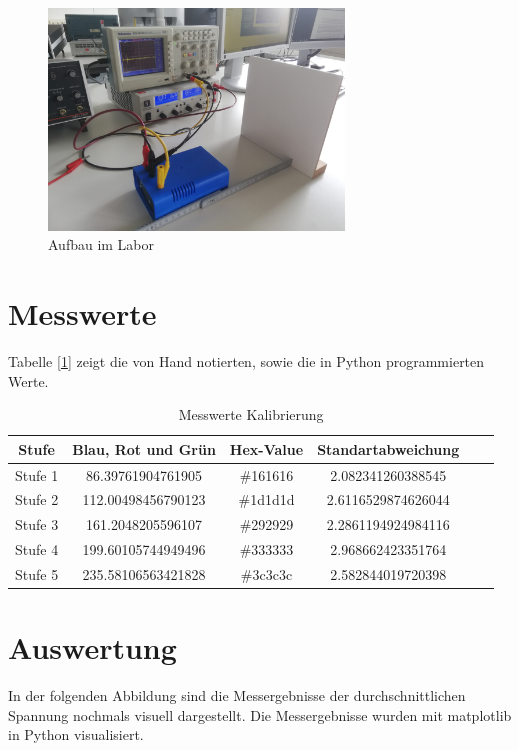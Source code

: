 \documentclass[12pt, oneside, a4paper, \docLanguage]{report}
\begin{document}
\begin{figure}[hbt!]
	\centering\small
	\includegraphics[width=0.7\textwidth]{media/aufbau.jpg}
	\caption{Aufbau im Labor}
	\label{fig:Aufbau im Labor}
\end{figure}
\newpage
\section{Messwerte}
\label{chap:VERSUCH_1_MESSWERTE}
Tabelle [\ref{chap:VERSUCH_1_MESSWERTE}] zeigt die von Hand notierten, sowie die in Python programmierten Werte.

\begin{table}[H]
	\centering\small
	\begin{tabular}{|c|c|c|c|c|c|}
		\hline
		Stufe & Blau, Rot und Grün & Hex-Value & Standartabweichung \\
		\hline
		Stufe 1 & 86.39761904761905 &  \#161616 & 2.082341260388545 \\
		\hline
		Stufe 2 & 112.00498456790123 &  \#1d1d1d & 2.6116529874626044 \\
		\hline
		Stufe 3 & 161.2048205596107 &  \#292929 & 2.2861194924984116 \\
		\hline
		Stufe 4 & 199.60105744949496 &  \#333333 & 2.968662423351764 \\
		\hline
		Stufe 5 & 235.58106563421828 &  \#3c3c3c & 2.582844019720398 \\
		\hline
	\end{tabular}
	\caption{Messwerte Kalibrierung}
	\label{fig:VERSUCH_1_MESSWERTE_TABELLE}
\end{table}

\newpage
\section{Auswertung}
\label{chap:VERSUCH_1_AUSWERTUNG}
In der folgenden Abbildung sind die Messergebnisse der durchschnittlichen Spannung nochmals visuell dargestellt. Die Messergebnisse wurden mit matplotlib in Python visualisiert.
\end{document}

